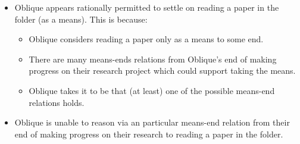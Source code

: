 \documentclass[10pt]{article}
\newcommand{\hozlinedash}[0]{%
  \noindent\hdashrule[0.5ex][c]{\textwidth}{.1pt}{2.5pt}
}
\begin{document}

\hozlinedash

\begin{itemize}
\item Oblique appears rationally permitted to settle on reading a paper in the folder (as a means).
  This is because:
  \begin{itemize}
  \item Oblique considers reading a paper only as a means to some end.
  \item There are many means-ends relations from Oblique's end of making progress on their research project which could support taking the means.
  \item Oblique takes it to be that (at least) one of the possible means-end relations holds.
  \end{itemize}
\item Oblique is unable to reason via an particular means-end relation from their end of making progress on their research to reading a paper in the folder.
\end{itemize}
\end{document}
